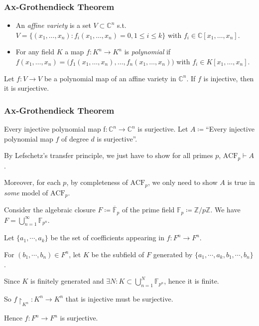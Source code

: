 \documentclass[UTF8,aspectratio=43,11pt,colorlinks,compress,openany]{beamer}%
\begin{document}
\begin{frame}\frametitle{Ax-Grothendieck Theorem}
\begin{itemize}
	\item An \emph{affine variety} is a set $V\subset\mathbb{C}^n$ s.t. $V=\big\{(x_1,\dots,x_n): f_i(x_1,\dots,x_n)=0, 1\leq i\leq k\big\}$ with $f_i\in\mathbb{C}[x_1,\dots,x_n]$.
	\item For any field $K$ a map $f: K^n\to K^n$ is \emph{polynomial} if $f(x_1,\dots,x_n)=\big(f_1(x_1,\dots,x_n),\dots,f_n(x_1,\dots,x_n)\big)$ with $f_i\in K[x_1,\dots,x_n]$.
\end{itemize}
	\begin{theorem}
		Let $f: V\to V$ be a polynomial map of an affine variety in $\mathbb{C}^n$. If $f$ is injective, then it is surjective.
	\end{theorem}
\end{frame}

\begin{frame}\frametitle{Ax-Grothendieck Theorem}
\setlength\abovedisplayskip{0pt}
\setlength\belowdisplayskip{0pt}
\begin{block}{Every injective polynomial map f$: \mathbb{C}^n\to \mathbb{C}^n$ is surjective.}
Let $A\coloneqq $``Every injective polynomial map $f$ of degree $d$ is surjective''.

By Lefschetz's transfer principle, we just have to show for all primes $p$, $\mathrm{ACF}_p\vdash A$.

Moreover, for each $p$, by completeness of $\mathrm{ACF}_p$, we only need to show $A$ is true in \emph{some} model of $\mathrm{ACF}_p$.

Consider the algebraic closure $F\coloneqq \overline{\mathbb{F}}_p$ of the prime field $\mathbb{F}_p\coloneqq \mathbb{Z}/p\mathbb{Z}$. We have $F=\bigcup\limits_{n=1}^\infty\mathbb{F}_{p^n}$.

Let $\{a_1, \cdots, a_k\}$ be the set of coefficients appearing in $f: F^n\to F^n$.

For $(b_1, \cdots, b_n) \in F^n$, let $K$ be the subfield of $F$ generated by $\{a_1, \cdots, a_k, b_1, \cdots, b_n\}$.

Since $K$ is finitely generated and $\exists N: K\subset\bigcup\limits_{n=1}^N\mathbb{F}_{p^n}$, hence it is finite.

So $f{\restriction_{K^n}}: K^n \to K^n$ that is injective must be surjective.

Hence $f: F^n\to F^n$ is surjective.
\end{block}
\end{frame}
\end{document}
